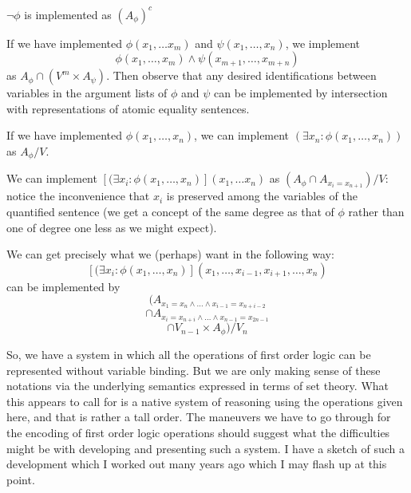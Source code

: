 \documentclass{slides}
\begin{document}
\begin{slide}

$\neg \phi$ is implemented as $(A_\phi)^c$

If we have implemented $\phi(x_1,\ldots x_m)$ and \newline $\psi(x_1,\ldots,x_n)$, we implement $$\phi(x_1,\ldots,x_m) \wedge \psi(x_{m+1},\ldots,x_{m+n})$$ as
$A_\phi \cap (V^m \times A_\psi)$.   Then observe that any desired identifications between variables in the argument lists of $\phi$ and $\psi$ can be implemented by intersection with representations of atomic equality sentences.

\end{slide}

\begin{slide}

If we have implemented $\phi(x_1,\ldots,x_n)$, we can implement $(\exists x_n:\phi(x_1,\ldots,x_n))$ as $A_\phi/V$.

We can implement $[(\exists x_i:\phi(x_1,\ldots,x_n)](x_1,\ldots x_n)$ as $(A_\phi \cap A_{x_i=x_{n+1}})/V$:  notice the inconvenience that
$x_i$ is preserved among the variables of the quantified sentence (we get a concept of the same degree as that of $\phi$ rather than one of degree one less as we might expect).

We can get precisely what we (perhaps) want in the following way:  $$[(\exists x_i:\phi(x_1,\ldots,x_n)](x_1,\ldots,x_{i-1},x_{i+1},\ldots, x_n)$$
can be implemented by $$(A_{x_1 = x_n \wedge \ldots \wedge x_{i-1} = x_{n+i-2}} $$ $$ \cap A_{x_{i}=x_{n+i}\wedge\ldots\wedge x_{n-1}=x_{2n-1}} $$ $$\cap V_{n-1} \times A_\phi)/V_n$$

\end{slide}

\begin{slide}

So, we have a system in which all the operations of first order logic can be represented without variable binding.  But we are only making sense of these notations via the underlying semantics expressed in terms of set theory.  What this appears to call for is a native system of reasoning using the operations given here, and that is rather a tall order.  The maneuvers we have to go through for the encoding of first order logic operations should suggest what the difficulties might be with developing and presenting such a system.  I have a sketch of such a development which I worked out many years ago which I may flash up at this point.

\end{slide}
\end{document}
